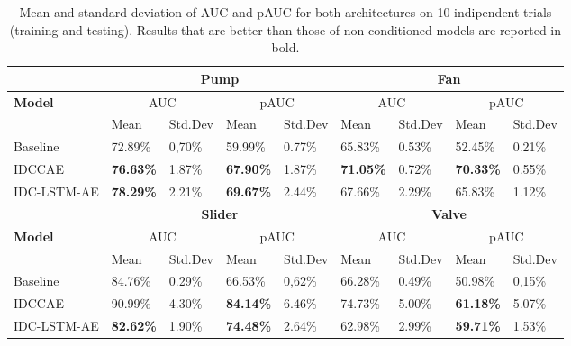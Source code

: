 \begin{table}[ht]
\small
\centering
\begin{tabular}{|m{2.8cm}|m{1.2cm}|m{1.3cm}|m{1.2cm}|m{1.3cm}|m{1.2cm}|m{1.3cm}|m{1.2cm}|m{1.3cm}|} 
\cline{2-9}
\multicolumn{1}{c|}{} & \multicolumn{4}{c|}{\textbf{Pump}} & \multicolumn{4}{c|}{\textbf{Fan}} \\ 
\hline
\multirow{2}{*}{\textbf{Model}} & \multicolumn{2}{c|}{AUC} & \multicolumn{2}{c|}{pAUC} & \multicolumn{2}{c|}{AUC} & \multicolumn{2}{c|}{pAUC} \\ 
\cline{2-9}
 & Mean & Std.Dev & Mean & Std.Dev & Mean & Std.Dev & Mean & Std.Dev \\ 
\hline
Baseline & 72.89\% & 0,70\%~ & 59.99\% & 0.77\% & 65.83\% & 0.53\% & 52.45\% & 0.21\% \\ 
\hline
IDCCAE & \textbf{76.63\%} & 1.87\% & \textbf{67.90\%} & 1.87\% & \textbf{71.05\%} & 0.72\% & \textbf{70.33\%} & 0.55\% \\ 
\hline
IDC-LSTM-AE & \textbf{78.29\%} & 2.21\% & \textbf{69.67\%} & 2.44\% & 67.66\% & 2.29\% & 65.83\% & 1.12\% \\ 
\hline
\multicolumn{1}{c|}{} & \multicolumn{4}{c|}{\textbf{Slider}} & \multicolumn{4}{c|}{\textbf{Valve}} \\ 
\hline
\multirow{2}{*}{\textbf{Model}} & \multicolumn{2}{c|}{AUC} & \multicolumn{2}{c|}{pAUC} & \multicolumn{2}{c|}{AUC} & \multicolumn{2}{c|}{pAUC} \\ 
\cline{2-9}
 & Mean & Std.Dev & Mean & Std.Dev & Mean & Std.Dev & Mean & Std.Dev \\ 
\hline
Baseline & 84.76\% & 0.29\% & 66.53\% & 0,62\%~ & 66.28\% & 0.49\% & 50.98\% & 0,15\%~ \\ 
\hline
IDCCAE & 90.99\% & 4.30\% & \textbf{84.14\%} & 6.46\% & 74.73\% & 5.00\% & \textbf{61.18\%} & 5.07\% \\ 
\hline
IDC-LSTM-AE & \textbf{82.62\%} & 1.90\% & \textbf{74.48\%} & 2.64\% & 62.98\% & 2.99\% & \textbf{59.71\%} & 1.53\% \\
\hline
\end{tabular}
\caption{Mean and standard deviation of AUC and pAUC for both architectures on 10 indipendent trials (training and testing). Results that are better than those of non-conditioned models are reported in bold. }
\label{results}
\end{table}

